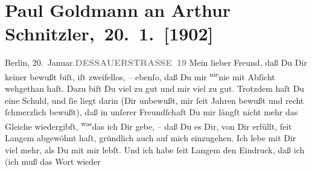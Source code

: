 

         
         \renewcommand{\erwaehntePersonen}{Personen: Paul Goldmann, Gerhart Hauptmann}
         \renewcommand{\erwaehnteOrte}{Orte: Berlin, Dessauer Straße, Wien}
         \renewcommand{\erwaehnteWerke}{Werke: Berliner Theater. »Einsame Menschen« im Deutschen Theater}
               \section[ Paul Goldmann an Arthur Schnitzler, 20. 1. {[}1902{]}]{ Paul Goldmann an Arthur Schnitzler, 20. 1. {[}1902{]}}\nopagebreak{}\rehead{ }\begin{ledgroupsized}[t]{13cm}\normalsize\beginnumbering{} \toendnotes[C]{\smallbreak\pagebreak[2]} 
\toendnotes[C]{\smallbreak}\pstart
           \noindent{}{\pb}Berlin, 20. Januar.\hfill \textcolor{gray}{\textbf{DESSAUERSTRASSE 19}}\pend
           \pstart
           Mein lieber Freund, daß Du Dir keiner \label{K_L03194-1v}\label{K_L03194-1h} bewußt biſt, iſt zweifellos, – ebenſo, daß Du mir \substVorne{}\textsuperscript{nie}\substDazwischen{}nie\substHinten{} mit Abſicht wehgethan haſt. Dazu biſt Du viel zu gut und mir viel zu gut.
                   Trotzdem haſt Du eine Schuld, und ſie liegt darin (Dir unbewußt, mir ſeit
               Jahren bewußt und recht ſchmerzlich bewußt), daß in unſerer Freundſchaft Du mir
               längſt nicht mehr das Gleiche wiedergibſt, \substVorne{}\textsuperscript{was}\substDazwischen{}das\substHinten{} ich Dir gebe, – daß Du  es Dir, von
               Dir erfüllt, ſeit Langem abgewöhnt haſt, \strikeout{\textcolor{gray}{r}} gründlich auch auf mich einzugehen. Ich lebe mit Dir viel mehr, als Du mit mir
               lebſt. Und ich habe ſeit Langem den Eindruck, daß ich (ich muß das Wort wieder

\end{ledgroupsized}

